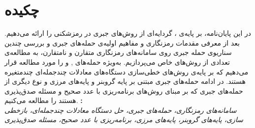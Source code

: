 \chapter*{چکیده}
\baselineskip=1cm
در این پایان‌نامه، بر پایه‌ی 
\cite{kreuzer2009algebraic}،
گردایه‌ای از روش‌های جبری در رمزشکنی را ارائه می‌دهیم. بعد از معرفی مقدمات رمزنگاری و مفاهیم اولیه‌ی حمله‌های جبری و بررسی چندین سناریوی حمله جبری روی  سامانه‌های رمزنگاری متقارن و نامتقارن، به مطالعه‌ی تعدادی از روش‌های خاص می‌پردازیم. به‌ویژه حمله‌های 
, 
و
را مورد مطالعه قرار می‌دهیم که بر پایه‌ی روش‌های خطی‌سازی دستگاه‌های معادلات چندجمله‌ای چندمتغیره هستند. در ادامه حمله‌های جبری مبتنی بر پایه‌ گروبنر و پایه‌های مرزی و نوع دیگری از حمله‌های جبری که بر مبنای روش‌های برنامه‌ریزی با عدد صحیح و مسئله صدق‌پذیری هستند را مطالعه می‌کنیم. 
\vskip 2cm
\textbf{:}\\
\textit{سامانه‌های رمزنگاری، حمله‌های جبری، حل دستگاه معادلات چندجمله‌ای، بازخطی سازی، پایه‌های گروبنر، پایه‌های مرزی، برنامه‌ریزی با عدد صحیح، مسئله صدق‌پذیری}
\baselineskip=0.75cm